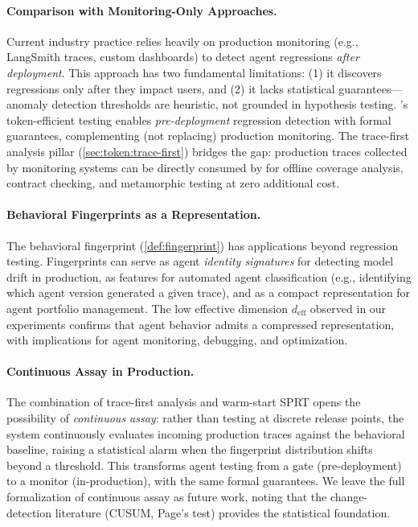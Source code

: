 \paragraph{Comparison with Monitoring-Only Approaches.}
Current industry practice relies heavily on production monitoring (e.g.,
LangSmith traces, custom dashboards) to detect agent regressions
\emph{after deployment}. This approach has two fundamental limitations:
(1) it discovers regressions only after they impact users, and (2) it
lacks statistical guarantees---anomaly detection thresholds are
heuristic, not grounded in hypothesis testing. \agentassay{}'s
token-efficient testing enables \emph{pre-deployment} regression
detection with formal guarantees, complementing (not replacing)
production monitoring. The trace-first analysis pillar
(\cref{sec:token:trace-first}) bridges the gap: production traces
collected by monitoring systems can be directly consumed by
\agentassay{} for offline coverage analysis, contract checking, and
metamorphic testing at zero additional cost.

\paragraph{Behavioral Fingerprints as a Representation.}
The behavioral fingerprint (\cref{def:fingerprint}) has applications
beyond regression testing. Fingerprints can serve as agent
\emph{identity signatures} for detecting model drift in production,
as features for automated agent classification (e.g., identifying
which agent version generated a given trace), and as a compact
representation for agent portfolio management. The low effective
dimension $d_{\mathrm{eff}}$ observed in our experiments confirms that
agent behavior admits a compressed representation, with implications
for agent monitoring, debugging, and optimization.

\paragraph{Continuous Assay in Production.}
The combination of trace-first analysis and warm-start SPRT opens the
possibility of \emph{continuous assay}: rather than testing at discrete
release points, the system continuously evaluates incoming production
traces against the behavioral baseline, raising a statistical alarm when
the fingerprint distribution shifts beyond a threshold. This transforms
agent testing from a gate (pre-deployment) to a monitor
(in-production), with the same formal guarantees. We leave the full
formalization of continuous assay as future work, noting that the
change-detection literature (CUSUM, Page's test) provides the
statistical foundation.


